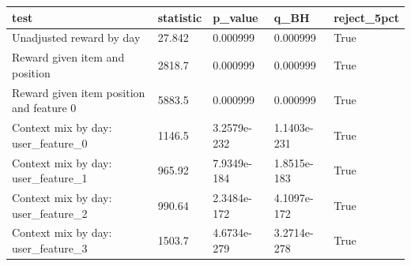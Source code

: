 \begin{tabular}{lllll}
\hline
test & statistic & p\_value & q\_BH & reject\_5pct \\
\hline
Unadjusted reward by day & 27.842 & 0.000999 & 0.000999 & True \\
Reward given item and position & 2818.7 & 0.000999 & 0.000999 & True \\
Reward given item position and feature 0 & 5883.5 & 0.000999 & 0.000999 & True \\
Context mix by day: user\_feature\_0 & 1146.5 & 3.2579e-232 & 1.1403e-231 & True \\
Context mix by day: user\_feature\_1 & 965.92 & 7.9349e-184 & 1.8515e-183 & True \\
Context mix by day: user\_feature\_2 & 990.64 & 2.3484e-172 & 4.1097e-172 & True \\
Context mix by day: user\_feature\_3 & 1503.7 & 4.6734e-279 & 3.2714e-278 & True \\
\hline
\end{tabular}
